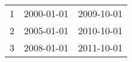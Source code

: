 % 
\begin{tabular}{ccc}
  \hline
  \hline
1 & 2000-01-01 & 2009-10-01 \\ 
  2 & 2005-01-01 & 2010-10-01 \\ 
  3 & 2008-01-01 & 2011-10-01 \\ 
   \hline
\end{tabular}
